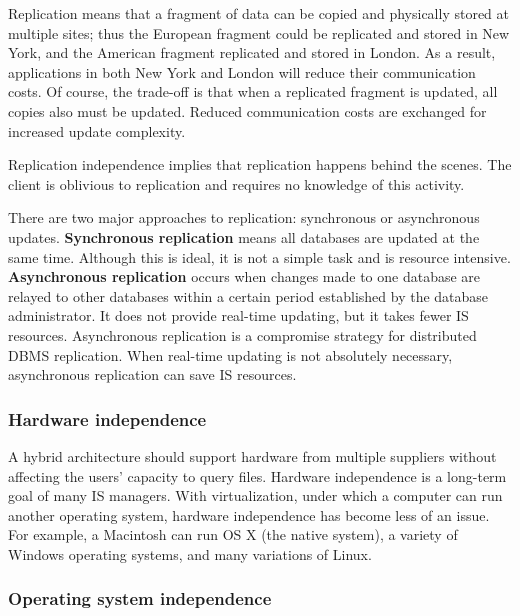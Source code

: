 \documentclass[
]{article}
\begin{document}
Replication means that a fragment of data can be copied and physically
stored at multiple sites; thus the European fragment could be replicated
and stored in New York, and the American fragment replicated and stored
in London. As a result, applications in both New York and London will
reduce their communication costs. Of course, the trade-off is that when
a replicated fragment is updated, all copies also must be updated.
Reduced communication costs are exchanged for increased update
complexity.

Replication independence implies that replication happens behind the
scenes. The client is oblivious to replication and requires no knowledge
of this activity.

There are two major approaches to replication: synchronous or
asynchronous updates. \textbf{Synchronous replication} means all databases
are updated at the same time. Although this is ideal, it is not a simple
task and is resource intensive. \textbf{Asynchronous replication} occurs when
changes made to one database are relayed to other databases within a
certain period established by the database administrator. It does not
provide real-time updating, but it takes fewer IS resources.
Asynchronous replication is a compromise strategy for distributed DBMS
replication. When real-time updating is not absolutely necessary,
asynchronous replication can save IS resources.

\hypertarget{hardware-independence}{%
\subsubsection*{Hardware independence}\label{hardware-independence}}

A hybrid architecture should support hardware from multiple suppliers
without affecting the users' capacity to query files. Hardware
independence is a long-term goal of many IS managers. With
virtualization, under which a computer can run another operating system,
hardware independence has become less of an issue. For example, a
Macintosh can run OS X (the native system), a variety of Windows
operating systems, and many variations of Linux.

\hypertarget{operating-system-independence}{%
\subsubsection*{Operating system independence}\label{operating-system-independence}}
\end{document}
